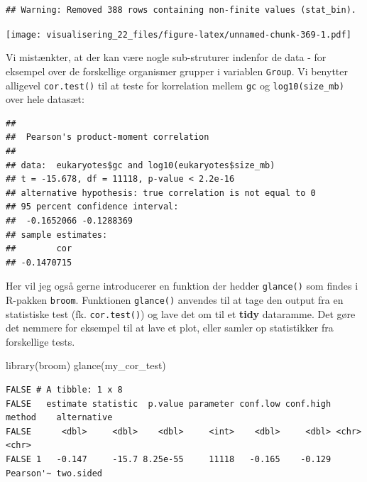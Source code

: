 \documentclass[
]{book}
\newenvironment{Shaded}{\begin{snugshade}}{\end{snugshade}}
\newcommand{\FunctionTok}[1]{\textcolor[rgb]{0.00,0.00,0.00}{#1}}
\newcommand{\NormalTok}[1]{#1}
\newcommand{\OtherTok}[1]{\textcolor[rgb]{0.56,0.35,0.01}{#1}}
\newcommand{\SpecialCharTok}[1]{\textcolor[rgb]{0.00,0.00,0.00}{#1}}
\begin{document}
\begin{verbatim}
## Warning: Removed 388 rows containing non-finite values (stat_bin).
\end{verbatim}

\texttt{[image: visualisering\_22\_files/figure-latex/unnamed-chunk-369-1.pdf]}

Vi mistænkter, at der kan være nogle sub-struturer indenfor de data - for eksempel over de forskellige organismer grupper i variablen \texttt{Group}. Vi benytter alligevel \texttt{cor.test()} til at teste for korrelation mellem \texttt{gc} og \texttt{log10(size\_mb)} over hele datasæt:

\begin{Shaded}
\end{Shaded}

\begin{verbatim}
## 
##  Pearson's product-moment correlation
## 
## data:  eukaryotes$gc and log10(eukaryotes$size_mb)
## t = -15.678, df = 11118, p-value < 2.2e-16
## alternative hypothesis: true correlation is not equal to 0
## 95 percent confidence interval:
##  -0.1652066 -0.1288369
## sample estimates:
##        cor 
## -0.1470715
\end{verbatim}

Her vil jeg også gerne introducerer en funktion der hedder \texttt{glance()} som findes i R-pakken \texttt{broom}. Funktionen \texttt{glance()} anvendes til at tage den output fra en statistiske test (fk. \texttt{cor.test()}) og lave det om til et \textbf{tidy} dataramme. Det gøre det nemmere for eksempel til at lave et plot, eller samler op statistikker fra forskellige tests.

\begin{Shaded}
\begin{Highlighting}[]
\FunctionTok{library}\NormalTok{(broom)}
\FunctionTok{glance}\NormalTok{(my\_cor\_test)}
\end{Highlighting}
\end{Shaded}

\begin{verbatim}
FALSE # A tibble: 1 x 8
FALSE   estimate statistic  p.value parameter conf.low conf.high method    alternative
FALSE      <dbl>     <dbl>    <dbl>     <int>    <dbl>     <dbl> <chr>     <chr>      
FALSE 1   -0.147     -15.7 8.25e-55     11118   -0.165    -0.129 Pearson'~ two.sided
\end{verbatim}
\end{document}
